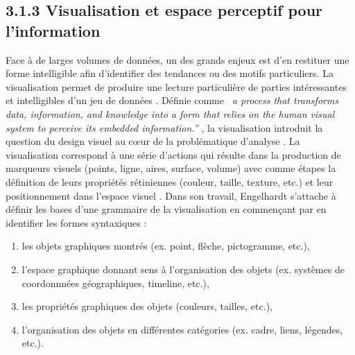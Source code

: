 \subsection[Visualisation et espace perceptif pour l{\textquoteright}information]{3.1.3 Visualisation et espace perceptif pour l{\textquoteright}information}

Face à de larges volumes de données, un des grands enjeux est d{\textquoteright}en restituer une forme intelligible afin d{\textquoteright}identifier des tendances ou des motifs particuliers. La visualisation permet de produire une lecture particulière de parties intéressantes et intelligibles d{\textquoteright}un jeu de données \citep{Cairo2013}. Définie comme \textit{{\guillemotleft}~a process that transforms data, information, and knowledge into a form that relies on the human visual system to perceive its embedded information.{\textquotedblright}} \citep{Graffieti2010}, la visualisation introduit la question du design visuel au c{\oe}ur de la problématique d{\textquoteright}analyse \citep{Wesolowsky1992}. La visualisation correspond à une série d{\textquoteright}actions qui résulte dans la production de marqueurs visuels (points, ligne, aires, surface, volume) avec comme étapes la définition de leurs propriétés rétiniennes (couleur, taille, texture, etc.) et leur positionnement dans l{\textquoteright}espace visuel \citep{Card1997}. Dans son travail, Engelhardt \cite{Engelhardt2007} s’attache   à définir les bases d{\textquoteright}une grammaire de la visualisation en commen\c{c}ant par en identifier les formes syntaxiques :  
\begin{enumerate}
\item les objets graphiques montrés (ex. point, flèche, pictogramme, etc.), 
\item l{\textquoteright}espace graphique donnant sens à l{\textquoteright}organisation des objets (ex. systèmes de coordonnnées géographiques, timeline, etc.), 
\item les propriétés graphiques des objets (couleurs, tailles, etc.), 
\item l{\textquoteright}organisation des objets en différentes catégories (ex. cadre, liens, légendes, etc.). 
\end{enumerate}


